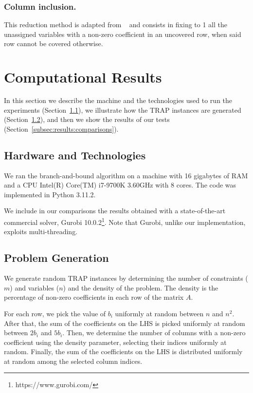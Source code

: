 \documentclass[runningheads]{llncs}
\begin{document}
\subsubsection{Column inclusion.} This reduction method is adapted from ~\cite{beasley-1987-algorithm} and consists in fixing to 1 all the unassigned variables with a non-zero coefficient in an uncovered row, when said row cannot be covered otherwise.

\section{Computational Results}
\label{sec:results}

In this section we describe the machine and the technologies used to run the experiments (Section~\ref{subsec:results:tech}), we illustrate how the TRAP instances are generated (Section~\ref{subsec:results:generation}), and then we show the results of our tests (Section~\ref{subsec:results:comparisons}).  

\subsection{Hardware and Technologies}
\label{subsec:results:tech}

We ran the branch-and-bound algorithm on a machine with 16 gigabytes of RAM and a CPU Intel(R) Core(TM) i7-9700K 3.60GHz with 8 cores. The code was implemented in Python 3.11.2.

We include in our comparisons the results obtained with a state-of-the-art commercial solver, Gurobi 10.0.2\footnote{https://www.gurobi.com/}. Note that Gurobi, unlike our implementation, exploits multi-threading. 


\subsection{Problem Generation}
\label{subsec:results:generation}

We generate random TRAP instances by determining the number of constraints ($m$) and variables ($n$) and the density of the problem. The density is the percentage of non-zero coefficients in each row of the matrix $A$.

For each row, we pick the value of $b_i$ uniformly at random between $n$ and $n^2$. After that, the sum of the coefficients on the LHS is picked uniformly at random between $2b_i$ and $5b_i$. Then, we determine the number of columns with a non-zero coefficient using the density parameter, selecting their indices uniformly at random. Finally, the sum of the coefficients on the LHS is distributed uniformly at random among the selected column indices.
\end{document}

